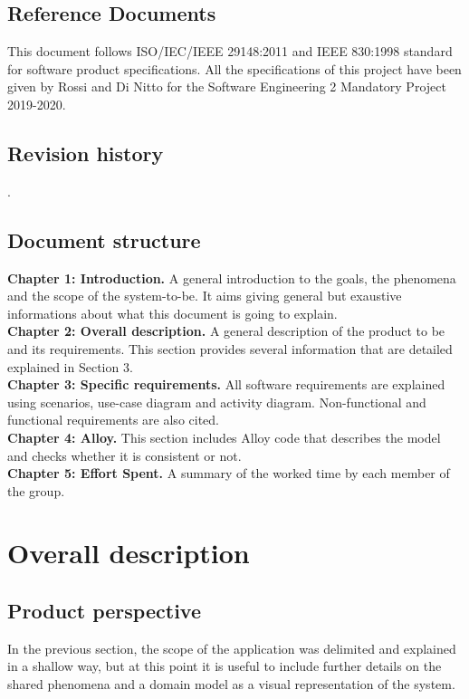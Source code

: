 \documentclass[a4paper, hidelinks, 12pt]{report}
\begin{document}
	\section{Reference Documents}\label{sec:reference-documents}
        This document follows ISO/IEC/IEEE 29148:2011 and IEEE 830:1998  standard for software product specifications.
        All the specifications of this project have been given by Rossi and Di Nitto for the Software Engineering 2 Mandatory Project 2019-2020.

	\section{Revision history}\label{sec:revision-history}
	.

	\section{Document structure}\label{sec:document-structure}
        \textbf{Chapter 1: Introduction.} A general introduction to the goals, the phenomena and the scope of the system-to-be. It aims giving general but exaustive informations about what this document is going to explain.
        \\
        \textbf{Chapter 2: Overall description.} A general description of the product to be and its requirements. This section provides several information that are detailed explained in Section 3.
        \\
        \textbf{Chapter 3: Specific requirements.} All software requirements are explained using scenarios, use-case diagram and activity diagram. Non-functional and functional requirements are also cited.
        \\
        \textbf{Chapter 4: Alloy.} This section includes Alloy code that describes the model and checks whether it is consistent or not.
        \\
        \textbf{Chapter 5: Effort Spent.} A summary of the worked time by each member of the group.

	\chapter{Overall description}\label{ch:overall-description}
	    \section{Product perspective}\label{sec:product-perspective}
	    In the previous section, the scope of the application was delimited and explained in a shallow way, but at this point it is useful to include further details on the shared phenomena and a domain model as a visual representation of the system.
\end{document}
